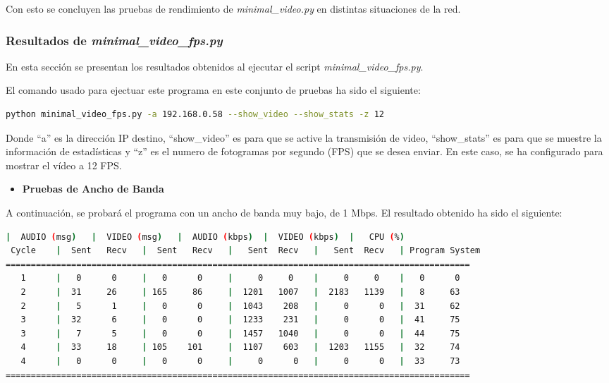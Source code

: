 Con esto se concluyen las pruebas de rendimiento de \textit{minimal\_video.py} en distintas situaciones de la red.

\newpage

\subsubsection{Resultados de \textit{minimal\_video\_fps.py}}
En esta sección se presentan los resultados obtenidos al ejecutar el script \textit{minimal\_video\_fps.py}.
\vspace{\baselineskip}

El comando usado para ejectuar este programa en este conjunto de pruebas ha sido el siguiente:

\begin{lstlisting}[language=bash, basicstyle=\ttfamily\scriptsize]
    python minimal_video_fps.py -a 192.168.0.58 --show_video --show_stats -z 12
\end{lstlisting}

Donde ``a'' es la dirección IP destino, ``show\_video'' es para que se active la transmisión de video, ``show\_stats'' es para que se muestre la información de estadísticas y ``z'' es el numero de fotogramas por segundo (FPS) que se desea enviar. En este caso, se ha configurado para mostrar el vídeo a 12 FPS.

\begin{itemize}
    \item \textbf{Pruebas de Ancho de Banda}
\end{itemize}

A continuación, se probará el programa con un ancho de banda muy bajo, de 1 Mbps. El resultado obtenido ha sido el siguiente:
\vspace{\baselineskip}

\begin{adjustbox}{max width=\textwidth}
\begin{lstlisting}[language=bash,basicstyle=\ttfamily\scriptsize]
          |  AUDIO (msg)   |  VIDEO (msg)   |  AUDIO (kbps)  |  VIDEO (kbps)  |   CPU (%)
 Cycle    |  Sent   Recv   |  Sent   Recv   |   Sent  Recv   |   Sent  Recv   | Program System
============================================================================================
   1      |   0      0     |   0      0     |     0     0    |     0     0    |   0      0
   2      |  31     26     | 165     86     |  1201   1007   |  2183   1139   |   8     63
   2      |   5      1     |   0      0     |  1043    208   |     0      0   |  31     62
   3      |  32      6     |   0      0     |  1233    231   |     0      0   |  41     75
   3      |   7      5     |   0      0     |  1457   1040   |     0      0   |  44     75
   4      |  33     18     | 105    101     |  1107    603   |  1203   1155   |  32     74
   4      |   0      0     |   0      0     |     0      0   |     0      0   |  33     73
============================================================================================
\end{lstlisting}
\end{adjustbox}

